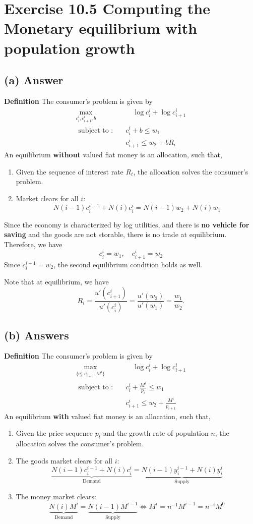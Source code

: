 \documentclass[11pt]{article}
\theoremstyle{definition}
\theoremstyle{boldtitle} %
\numberwithin{equation}{section}
\numberwithin{figure}{section}
\numberwithin{table}{section}
\begin{document}
\section{Exercise 10.5 Computing the Monetary equilibrium with population growth}
\subsection{(a) Answer}
\noindent \textbf{Definition}
The consumer's problem is given by 
\begin{align*}
    \max_{c_i^i, c_{i+1}^i, b} &  \quad \log c_i^i + \log c_{i+1}^i \\ 
    \text{ subject to :} \quad & c_i^i + b \leq  w_1  \\
    & c_{i+1}^i \leq w_2 + b R_{i}
\end{align*}
An equilibrium \textbf{without} valued fiat money is 
an allocation, such that, 
\begin{enumerate}
    \item Given the sequence of interest rate $R_t$, the allocation solves the consumer's problem.
    \item Market clears for all $i$:
    \[
        N(i-1) c_i^{i-1} +  N(i) c_i^{i} = N(i-1) w_2 +  N(i) w_1
    \]
\end{enumerate}
Since the economy is characterized by log utilities, and there is \textbf{no vehicle for saving} and the goods are not storable,
there is no trade at equilibrium.
Therefore, we have 
\[
c^i_{i} = w_1, \quad c^i_{i+1} = w_2
\]
Since $c^{i-1}_i = w_2$, the second equilibrium condition holds as well.

Note that at equilibrium, we have 
\[
R_i = \frac{u'(c^i_{i+1})}{u'(c^i_{i})} = \frac{u'(w_2)}{u'(w_1)} = \frac{w_1}{w_2}.
\]


\subsection{(b) Answers}
\noindent \textbf{Definition}
The consumer's problem is given by 
\begin{align*}
    \max_{\{c_i^i, c_{i+1}^i, M^i\}} &  \quad \log c_i^i + \log c_{i+1}^i \\ 
    \text{ subject to :} \quad & c_i^i + \frac{M^i}{p_{i}} \leq w_1 \\ 
        & c_{i+1}^i  \leq w_2 + \frac{M^i}{p_{i+1}}
\end{align*}
An equilibrium \textbf{with} valued fiat money is 
an allocation, such that, 
\begin{enumerate}
    \item Given the price sequence $p_t$ and the growth rate of population $n$, the allocation solves the consumer's problem.
    \item The goods market clears for all $i$:
    \[
        \underbrace{N(i-1) c_i^{i-1} +  N(i) c_i^{i}}_{\text{Demand}} = \underbrace{N(i-1) y_i^{i-1} +  N(i) y_i^{i}}_{\text{Supply}}
    \]
    \item The money market clears:
    \[
        \underbrace{N(i) M^i}_{\text{Demand}} = \underbrace{N(i-1) M^{i-1}}_{\text{Supply}} \Leftrightarrow M^i = n^{-1} M^{i-1} = n^{-i} M^0
    \]
\end{enumerate}
\end{document}
